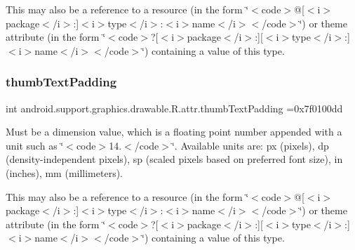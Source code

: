 This may also be a reference to a resource (in the form \char`\"{}$<$code$>$@\mbox{[}$<$i$>$package$<$/i$>$\+:\mbox{]}$<$i$>$type$<$/i$>$\+:$<$i$>$name$<$/i$>$$<$/code$>$\char`\"{}) or theme attribute (in the form \char`\"{}$<$code$>$?\mbox{[}$<$i$>$package$<$/i$>$\+:\mbox{]}\mbox{[}$<$i$>$type$<$/i$>$\+:\mbox{]}$<$i$>$name$<$/i$>$$<$/code$>$\char`\"{}) containing a value of this type. \mbox{\label{classandroid_1_1support_1_1graphics_1_1drawable_1_1R_1_1attr_a158b375a3bcdc3f6ad3be4d32efc9766}} 
\subsubsection{\texorpdfstring{thumb\+Text\+Padding}{thumbTextPadding}}
{\footnotesize\ttfamily int android.\+support.\+graphics.\+drawable.\+R.\+attr.\+thumb\+Text\+Padding =0x7f0100dd\hspace{0.3cm}{\ttfamily [static]}}

Must be a dimension value, which is a floating point number appended with a unit such as \char`\"{}$<$code$>$14.\+5sp$<$/code$>$\char`\"{}. Available units are\+: px (pixels), dp (density-\/independent pixels), sp (scaled pixels based on preferred font size), in (inches), mm (millimeters). 

This may also be a reference to a resource (in the form \char`\"{}$<$code$>$@\mbox{[}$<$i$>$package$<$/i$>$\+:\mbox{]}$<$i$>$type$<$/i$>$\+:$<$i$>$name$<$/i$>$$<$/code$>$\char`\"{}) or theme attribute (in the form \char`\"{}$<$code$>$?\mbox{[}$<$i$>$package$<$/i$>$\+:\mbox{]}\mbox{[}$<$i$>$type$<$/i$>$\+:\mbox{]}$<$i$>$name$<$/i$>$$<$/code$>$\char`\"{}) containing a value of this type. \mbox{\label{classandroid_1_1support_1_1graphics_1_1drawable_1_1R_1_1attr_ac9fc993403b5382c2bcaff3ab14d3943}} 
